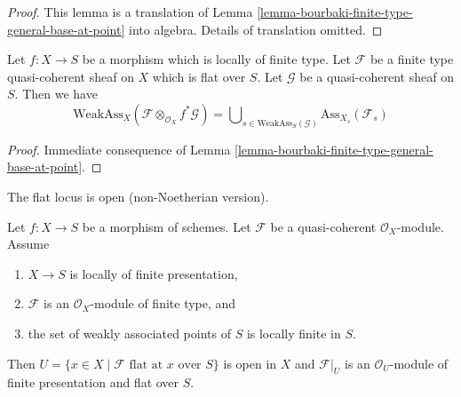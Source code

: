 \begin{proof}
This lemma is a translation of
Lemma \ref{lemma-bourbaki-finite-type-general-base-at-point}
into algebra. Details of translation omitted.
\end{proof}

\begin{lemma}
\label{lemma-bourbaki-finite-type-general-base}
Let $f : X \to S$ be a morphism which is locally of finite type.
Let $\mathcal{F}$ be a finite type quasi-coherent sheaf on $X$
which is flat over $S$. Let $\mathcal{G}$ be a quasi-coherent sheaf on $S$.
Then we have
$$
\text{WeakAss}_X(\mathcal{F} \otimes_{\mathcal{O}_X} f^*\mathcal{G}) =
\bigcup\nolimits_{s \in \text{WeakAss}_S(\mathcal{G})}
\text{Ass}_{X_s}(\mathcal{F}_s)
$$
\end{lemma}

\begin{proof}
Immediate consequence of
Lemma \ref{lemma-bourbaki-finite-type-general-base-at-point}.
\end{proof}

\begin{theorem}
\label{theorem-finite-type-flat}
\begin{slogan}
The flat locus is open (non-Noetherian version).
\end{slogan}
Let $f : X \to S$ be a morphism of schemes.
Let $\mathcal{F}$ be a quasi-coherent $\mathcal{O}_X$-module.
Assume
\begin{enumerate}
\item $X \to S$ is locally of finite presentation,
\item $\mathcal{F}$ is an $\mathcal{O}_X$-module of finite type, and
\item the set of weakly associated points of $S$ is locally finite in $S$.
\end{enumerate}
Then $U = \{x \in X \mid \mathcal{F}\text{ flat at }x\text{ over }S\}$
is open in $X$ and $\mathcal{F}|_U$ is an $\mathcal{O}_U$-module
of finite presentation and flat over $S$.
\end{theorem}

